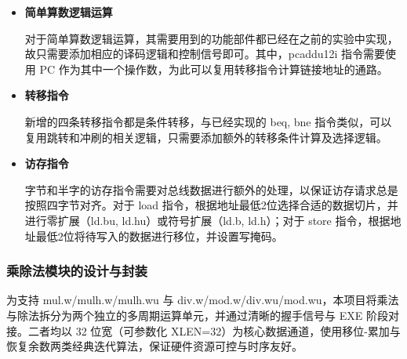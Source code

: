 \documentclass[11pt]{article}
\begin{document}
\begin{itemize}

\item \textbf{简单算数逻辑运算}

  对于简单算数逻辑运算，其需要用到的功能部件都已经在之前的实验中实现，故只需要添加相应的译码逻辑和控制信号即可。其中，pcaddu12i 指令需要使用 PC 作为其中一个操作数，为此可以复用转移指令计算链接地址的通路。

\item \textbf{转移指令}

  新增的四条转移指令都是条件转移，与已经实现的 beq, bne 指令类似，可以复用跳转和冲刷的相关逻辑，只需要添加额外的转移条件计算及选择逻辑。

\item \textbf{访存指令}

  字节和半字的访存指令需要对总线数据进行额外的处理，以保证访存请求总是按照四字节对齐。对于 load 指令，根据地址最低2位选择合适的数据切片，并进行零扩展（ld.bu, ld.hu）或符号扩展（ld.b, ld.h）；对于 store 指令，根据地址最低2位将待写入的数据进行移位，并设置写掩码。

\end{itemize}

\subsubsection{乘除法模块的设计与封装}

为支持 mul.w/mulh.w/mulh.wu 与
div.w/mod.w/div.wu/mod.wu，本项目将乘法与除法拆分为两个独立的多周期运算单元，并通过清晰的握手信号与 EXE 阶段对接。二者均以 32 位宽（可参数化 XLEN=32）为核心数据通道，使用移位-累加与恢复余数两类经典迭代算法，保证硬件资源可控与时序友好。
\end{document}

